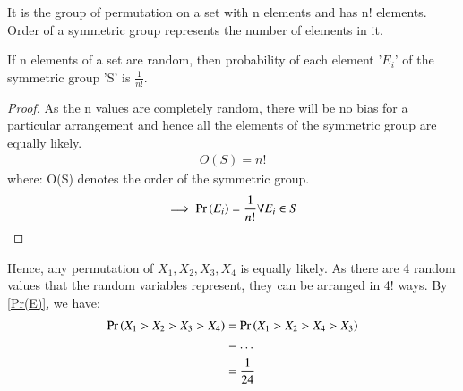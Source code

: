 \documentclass[journal,12pt,twocolumn]{IEEEtran}
\begin{document}
\begin{definition}
It is the group of permutation on a set with n elements and has n! elements. Order of a symmetric group represents the number of elements in it.
\end{definition}

\begin{lemma}
If n elements of a set are random, then probability of each element '$E_i$' of the symmetric group 'S' is $\frac{1}{n!}$.
\end{lemma}
\begin{proof}
As the n values are completely random, there will be no bias for a particular arrangement and hence all the elements of the symmetric group are equally likely.
\begin{align}
    O(S) = n!
\end{align}
where: O(S) denotes the order of the symmetric group.
\begin{align}
\implies \Pr\left(E_i\right) = \frac{1}{n!} \forall E_i \in S \label{Pr(E)}
\end{align}

\end{proof}
Hence, any permutation of $X_1,X_2,X_3,X_4$ is equally likely.
As there are 4 random values that the random variables represent, they can be arranged in 4! ways. By \eqref{Pr(E)}, we have:
\begin{align}
   \Pr\left(X_1>X_2>X_3>X_4\right) &= \Pr\left(X_1>X_2>X_4>X_3\right) \\&= \dots\\ &= \frac{1}{24}
\end{align}
\end{document}
